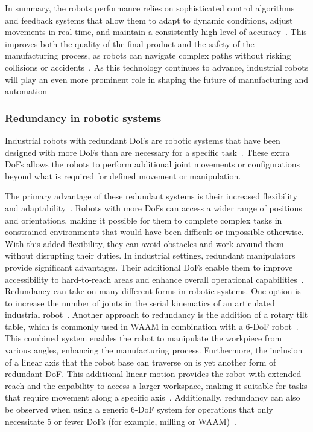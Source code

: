 In summary, the robots performance relies on sophisticated control algorithms and feedback systems that allow them to adapt to dynamic conditions, adjust movements in real-time, and maintain a consistently high level of accuracy~\cite{Lin.2023}. This improves both the quality of the final product and the safety of the manufacturing process, as robots can navigate complex paths without risking collisions or accidents~\cite{Bosscher.2011}.
As this technology continues to advance, industrial robots will play an even more prominent role in shaping the future of manufacturing and automation~\cite{Domae.2019}


\subsubsection{Redundancy in robotic systems}

Industrial robots with redundant \acrshort{DoF}s are robotic systems that have been designed with more \acrshort{DoF}s than are necessary for a specific task~\cite{Wang.2022}. These extra \acrshort{DoF}s allows the robots to perform additional joint movements or configurations beyond what is required for defined movement or manipulation.

The primary advantage of these redundant systems is their increased flexibility and adaptability~\cite{Duong.2021}. Robots with more \acrshort{DoF}s can access a wider range of positions and orientations, making it possible for them to complete complex tasks in constrained environments that would have been difficult or impossible otherwise. With this added flexibility, they can avoid obstacles and work around them without disrupting their duties. In industrial settings, redundant manipulators provide significant advantages. Their additional \acrshort{DoF}s enable them to improve accessibility to hard-to-reach areas and enhance overall operational capabilities~\cite{Shi.2021}.  Redundancy can take on many different forms in robotic systems. One option is to increase the number of joints in the serial kinematics of an articulated industrial robot~\cite{Milenkovic.2021}. \newline
Another approach to redundancy is the addition of a rotary tilt table, which is commonly used in \acrshort{WAAM} in combination with a 6-\acrshort{DoF} robot~\cite{Yuan.2020}. This combined system enables the robot to manipulate the workpiece from various angles, enhancing the manufacturing process.
Furthermore, the inclusion of a linear axis that the robot base can traverse on is yet another form of redundant \acrshort{DoF}. This additional linear motion provides the robot with extended reach and the capability to access a larger workspace, making it suitable for tasks that require movement along a specific axis~\cite{Boscariol.2019}.
Additionally, redundancy can also be observed when using a generic 6-\acrshort{DoF} system for operations that only necessitate 5 or fewer \acrshort{DoF}s (for example, milling or \acrshort{WAAM})~\cite{Hanafusa.1981,Wang.2022}. %



